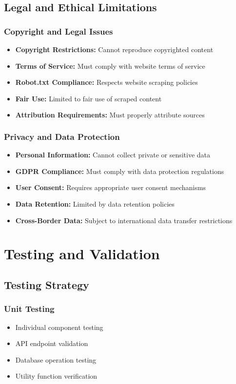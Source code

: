 \documentclass[12pt,a4paper]{article}
\begin{document}
\subsection{Legal and Ethical Limitations}

\subsubsection{Copyright and Legal Issues}
\begin{itemize}
    \item \textbf{Copyright Restrictions:} Cannot reproduce copyrighted content
    \item \textbf{Terms of Service:} Must comply with website terms of service
    \item \textbf{Robot.txt Compliance:} Respects website scraping policies
    \item \textbf{Fair Use:} Limited to fair use of scraped content
    \item \textbf{Attribution Requirements:} Must properly attribute sources
\end{itemize}

\subsubsection{Privacy and Data Protection}
\begin{itemize}
    \item \textbf{Personal Information:} Cannot collect private or sensitive data
    \item \textbf{GDPR Compliance:} Must comply with data protection regulations
    \item \textbf{User Consent:} Requires appropriate user consent mechanisms
    \item \textbf{Data Retention:} Limited by data retention policies
    \item \textbf{Cross-Border Data:} Subject to international data transfer restrictions
\end{itemize}

\section{Testing and Validation}

\subsection{Testing Strategy}

\subsubsection{Unit Testing}
\begin{itemize}
    \item Individual component testing
    \item API endpoint validation
    \item Database operation testing
    \item Utility function verification
\end{itemize}
\end{document}

